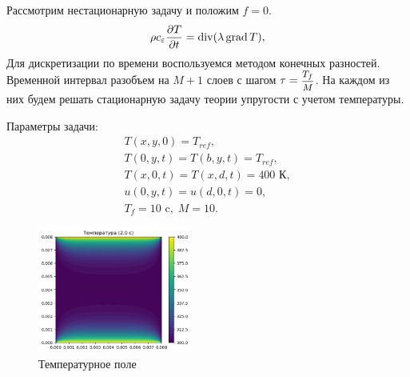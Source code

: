 \documentclass[12pt, a4paper]{article}
\begin{document}
Рассмотрим нестационарную задачу и положим $f=0$.
\[
\rho c_\varepsilon\frac{\partial T}{\partial t}=\mathrm{div}(\lambda\,\mathrm{grad}\, T),
\]
 Для дискретизации по времени воспользуемся методом конечных разностей. Временной интервал разобъем на $M+1$ слоев с шагом $\tau = \hbox{\footnotesize$\displaystyle\frac{T_f}{M}$}$. На каждом из них будем решать стационарную задачу теории упругости с учетом температуры.
 
Параметры задачи:
\[
\begin{gathered}
	T(x,y,0) =T_{ref},\\ T(0,y,t)=T(b,y,t) = T_{ref},\\ T(x,0,t)=T(x,d,t)=400 \text{ К},\\
	u(0,y,t)=u(d,0,t)=0,\\
	T_f = 10 \text{ c},\; M = 10. 
\end{gathered}
\]
	\begin{figure}[H]
	\centering
	\includegraphics[width=0.45\textwidth]{temp_2c}
	\caption{Температурное поле}
\end{figure}
\end{document}
